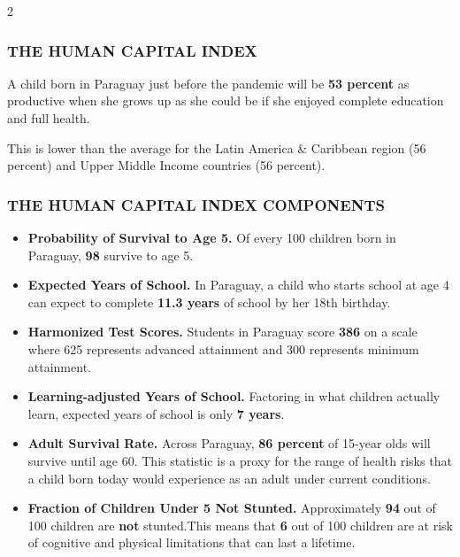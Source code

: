 \documentclass[
  9pt,
]{article}
\begin{document}
\begin {multicols}{2}

\hypertarget{section}{%
\subsubsection{\texorpdfstring{\textcolor{bondiblue}{\textbf{T\small{HE HUMAN CAPITAL INDEX}}}}{}}\label{section}}

A child born in Paraguay just before the pandemic will be \textbf{53
percent} as productive when she grows up as she could be if she enjoyed
complete education and full health.

This is lower than the average for the Latin America \& Caribbean region
(56 percent) and Upper Middle Income countries (56 percent).

\hypertarget{section-1}{%
\subsubsection{\texorpdfstring{\textcolor{bondiblue}{\textbf{T\small{HE HUMAN CAPITAL INDEX COMPONENTS}}}}{}}\label{section-1}}

\begin{itemize}
\item
  \textbf{Probability of Survival to Age 5.} Of every 100 children born
  in Paraguay, \textbf{98} survive to age 5.
\item
  \textbf{Expected Years of School.} In Paraguay, a child who starts
  school at age 4 can expect to complete \textbf{11.3 years} of school
  by her 18th birthday.
\item
  \textbf{Harmonized Test Scores.} Students in Paraguay score
  \textbf{386} on a scale where 625 represents advanced attainment and
  300 represents minimum attainment.
\item
  \textbf{Learning-adjusted Years of School.} Factoring in what children
  actually learn, expected years of school is only \textbf{7 years}.
\item
  \textbf{Adult Survival Rate.} Across Paraguay, \textbf{86 percent} of
  15-year olds will survive until age 60. This statistic is a proxy for
  the range of health risks that a child born today would experience as
  an adult under current conditions.
\item
  \textbf{Fraction of Children Under 5 Not Stunted.} Approximately
  \textbf{94} out of 100 children are \textbf{not} stunted.This means
  that \textbf{6} out of 100 children are at risk of cognitive and
  physical limitations that can last a lifetime.
\end{itemize}


\end{multicols}
\end{document}
